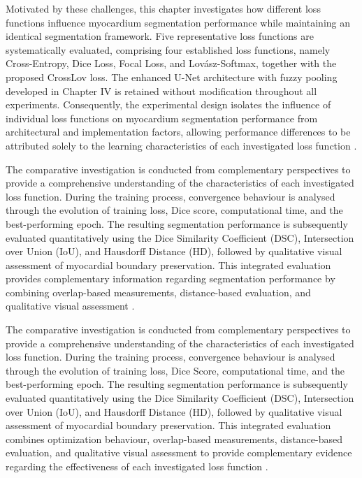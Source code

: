 Motivated by these challenges, this chapter investigates how different loss functions influence myocardium segmentation performance while maintaining an identical segmentation framework. Five representative loss functions are systematically evaluated, comprising four established loss functions, namely Cross-Entropy, Dice Loss, Focal Loss, and Lovász-Softmax, together with the proposed CrossLov loss. The enhanced U-Net architecture with fuzzy pooling developed in Chapter IV is retained without modification throughout all experiments. Consequently, the experimental design isolates the influence of individual loss functions on myocardium segmentation performance from architectural and implementation factors, allowing performance differences to be attributed solely to the learning characteristics of each investigated loss function \citep{Riandini2025Array}. 

The comparative investigation is conducted from complementary perspectives to provide a comprehensive understanding of the characteristics of each investigated loss function. During the training process, convergence behaviour is analysed through the evolution of training loss, Dice score, computational time, and the best-performing epoch. The resulting segmentation performance is subsequently evaluated quantitatively using the Dice Similarity Coefficient (DSC), Intersection over Union (IoU), and Hausdorff Distance (HD), followed by qualitative visual assessment of myocardial boundary preservation. This integrated evaluation provides complementary information regarding segmentation performance by combining overlap-based measurements, distance-based evaluation, and qualitative visual assessment \citep{Taha2015,Jadon2020,Riandini2025Array}.  

The comparative investigation is conducted from complementary perspectives to provide a comprehensive understanding of the characteristics of each investigated loss function. During the training process, convergence behaviour is analysed through the evolution of training loss, Dice Score, computational time, and the best-performing epoch. The resulting segmentation performance is subsequently evaluated quantitatively using the Dice Similarity Coefficient (DSC), Intersection over Union (IoU), and Hausdorff Distance (HD), followed by qualitative visual assessment of myocardial boundary preservation. This integrated evaluation combines optimization behaviour, overlap-based measurements, distance-based evaluation, and qualitative visual assessment to provide complementary evidence regarding the effectiveness of each investigated loss function \citep{Taha2015,Jadon2020,Ma2021,Riandini2025Array}.

